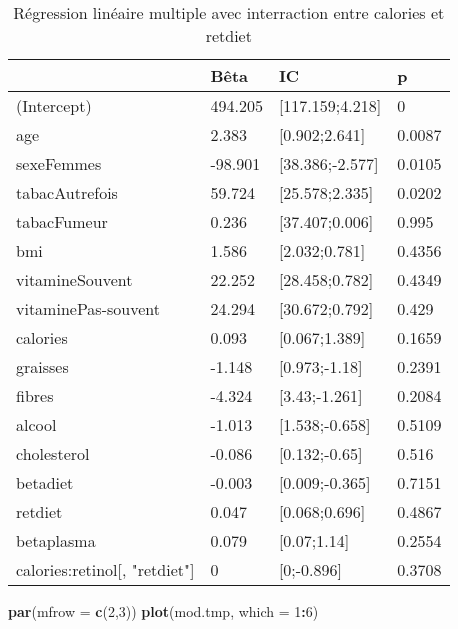 \documentclass[]{article}
\newenvironment{Shaded}{\begin{snugshade}}{\end{snugshade}}
\newcommand{\KeywordTok}[1]{\textcolor[rgb]{0.13,0.29,0.53}{\textbf{#1}}}
\newcommand{\DataTypeTok}[1]{\textcolor[rgb]{0.13,0.29,0.53}{#1}}
\newcommand{\DecValTok}[1]{\textcolor[rgb]{0.00,0.00,0.81}{#1}}
\newcommand{\OperatorTok}[1]{\textcolor[rgb]{0.81,0.36,0.00}{\textbf{#1}}}
\newcommand{\NormalTok}[1]{#1}
\begin{document}
\begin{table}

\caption{\label{tab:unnamed-chunk-74}Régression linéaire multiple avec interraction entre calories et retdiet}
\centering
\begin{tabular}[t]{l|l|l|l}
\hline
  & Bêta & IC & p\\
\hline
\rowcolor[HTML]{BBD2E1}  (Intercept) & 494.205 & [117.159;4.218] & 0\\
\hline
age & 2.383 & [0.902;2.641] & 0.0087\\
\hline
\rowcolor[HTML]{BBD2E1}  sexeFemmes & -98.901 & [38.386;-2.577] & 0.0105\\
\hline
tabacAutrefois & 59.724 & [25.578;2.335] & 0.0202\\
\hline
\rowcolor[HTML]{BBD2E1}  tabacFumeur & 0.236 & [37.407;0.006] & 0.995\\
\hline
bmi & 1.586 & [2.032;0.781] & 0.4356\\
\hline
\rowcolor[HTML]{BBD2E1}  vitamineSouvent & 22.252 & [28.458;0.782] & 0.4349\\
\hline
vitaminePas-souvent & 24.294 & [30.672;0.792] & 0.429\\
\hline
\rowcolor[HTML]{BBD2E1}  calories & 0.093 & [0.067;1.389] & 0.1659\\
\hline
graisses & -1.148 & [0.973;-1.18] & 0.2391\\
\hline
\rowcolor[HTML]{BBD2E1}  fibres & -4.324 & [3.43;-1.261] & 0.2084\\
\hline
alcool & -1.013 & [1.538;-0.658] & 0.5109\\
\hline
\rowcolor[HTML]{BBD2E1}  cholesterol & -0.086 & [0.132;-0.65] & 0.516\\
\hline
betadiet & -0.003 & [0.009;-0.365] & 0.7151\\
\hline
\rowcolor[HTML]{BBD2E1}  retdiet & 0.047 & [0.068;0.696] & 0.4867\\
\hline
betaplasma & 0.079 & [0.07;1.14] & 0.2554\\
\hline
\rowcolor[HTML]{BBD2E1}  calories:retinol[, "retdiet"] & 0 & [0;-0.896] & 0.3708\\
\hline
\end{tabular}
\end{table}

\begin{Shaded}
\begin{Highlighting}[]
\KeywordTok{par}\NormalTok{(}\DataTypeTok{mfrow =} \KeywordTok{c}\NormalTok{(}\DecValTok{2}\NormalTok{,}\DecValTok{3}\NormalTok{))}
\KeywordTok{plot}\NormalTok{(mod.tmp, }\DataTypeTok{which =} \DecValTok{1}\OperatorTok{:}\DecValTok{6}\NormalTok{)}
\end{Highlighting}
\end{Shaded}
\end{document}
